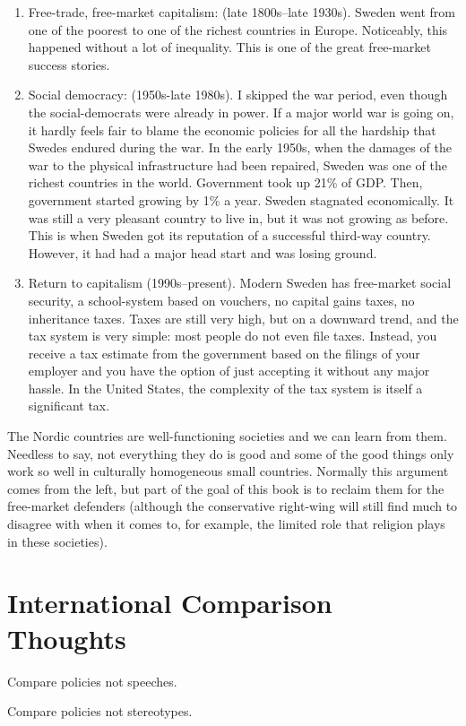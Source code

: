 \begin{enumerate}
\item Free-trade, free-market capitalism: (late 1800s--late 1930s). Sweden went
from one of the poorest to one of the richest countries in Europe. Noticeably,
this happened without a lot of inequality. This is one of the great free-market
success stories.
\item Social democracy: (1950s-late 1980s). I skipped the war period, even
though the social-democrats were already in power. If a major world war is
going on, it hardly feels fair to blame the economic policies for all the
hardship that Swedes endured during the war. In the early 1950s, when the
damages of the war to the physical infrastructure had been repaired, Sweden was
one of the richest countries in the world. Government took up 21\% of GDP.
Then, government started growing by 1\% a year. Sweden stagnated economically.
It was still a very pleasant country to live in,  but it was not growing as
before. This is when Sweden got its reputation of a successful third-way
country. However, it had had a major head start and was losing ground.
\item Return to capitalism (1990s--present). Modern Sweden has free-market
social security, a school-system based on vouchers, no capital gains taxes, no
inheritance taxes. Taxes are still very high, but on a downward trend, and the
tax system is very simple: most people do not even file taxes. Instead, you
receive a tax estimate from the government based on the filings of your
employer and you have the option of just accepting it without any major hassle.
In the United States, the complexity of the tax system is itself a significant
tax.
\end{enumerate}

The Nordic countries are well-functioning societies and we can learn from them.
Needless to say, not everything they do is good and some of the good
things only work so well in culturally homogeneous small countries. Normally
this argument comes from the left, but part of the goal of this book is to
reclaim them for the free-market defenders (although the conservative
right-wing will still find much to disagree with when it comes to, for example,
the limited role that religion plays in these societies).

\section{International Comparison Thoughts}

\thought Compare policies not speeches.

\thought Compare policies not stereotypes.

